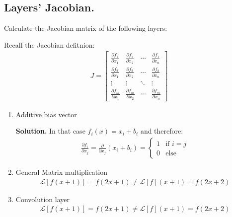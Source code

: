 \documentclass{article}
\begin{document}
\subsection{Layers’ Jacobian.} Calculate the Jacobian matrix of the following layers:

Recall the Jacobian defitnion:
  \begin{equation*}
    \begin{split}
J = \begin{bmatrix}
\frac{\partial f_1}{\partial x_1} & \frac{\partial f_1}{\partial x_2} & \cdots & \frac{\partial f_1}{\partial x_n} \\
\frac{\partial f_2}{\partial x_1} & \frac{\partial f_2}{\partial x_2} & \cdots & \frac{\partial f_2}{\partial x_n} \\
\vdots & \vdots & \ddots & \vdots \\
\frac{\partial f_m}{\partial x_1} & \frac{\partial f_m}{\partial x_2} & \cdots & \frac{\partial f_m}{\partial x_n}
\end{bmatrix}
    \end{split}
\end{equation*}

\begin{enumerate}
  \item Additive bias vector 

    \textbf{Solution.} In that case $f_i(x) = x_{i} + b_{i}$ and therefore: 
  \begin{equation*}
    \begin{split}
      \frac{\partial f_i}{\partial x_j} = \frac{\partial }{\partial x_j} \left( x_{i} + b_{i} \right) = \begin{cases} 1 & \text{if } i = j \\ 0 & \text{else}  \end{cases}
    \end{split}
\end{equation*}
  \item General Matrix multiplication
  \begin{equation*}
    \begin{split}
    \mathcal{L}[f(x+1)] = f(2x+1) \neq \mathcal{L}[f](x+1)= f(2x + 2)
    \end{split}
\end{equation*}
  \item Convolution layer
  \begin{equation*}
    \begin{split}
    \mathcal{L}[f(x+1)] = f(2x+1) \neq \mathcal{L}[f](x+1)= f(2x + 2)
    \end{split}
\end{equation*}
\end{enumerate}
\end{document}
